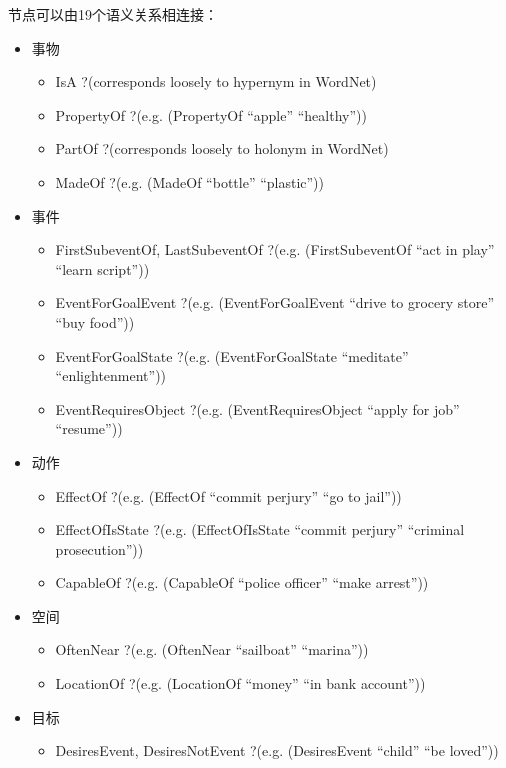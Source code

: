 节点可以由19个语义关系相连接：
\begin{itemize}

\item 事物 
\begin{itemize}
\item IsA ?(corresponds loosely to hypernym in WordNet)
\item PropertyOf ?(e.g. (PropertyOf ``apple'' ``healthy''))
\item PartOf ?(corresponds loosely to holonym in WordNet)
\item MadeOf ?(e.g. (MadeOf ``bottle'' ``plastic''))
\end{itemize}

\item 事件 
\begin{itemize}
\item FirstSubeventOf, LastSubeventOf ?(e.g. (FirstSubeventOf ``act in play'' ``learn script''))
\item EventForGoalEvent ?(e.g. (EventForGoalEvent ``drive to grocery store'' ``buy food''))
\item EventForGoalState ?(e.g. (EventForGoalState ``meditate'' ``enlightenment''))
\item EventRequiresObject ?(e.g. (EventRequiresObject ``apply for job'' ``resume''))
\end{itemize}

\item 动作 
\begin{itemize}
\item EffectOf ?(e.g. (EffectOf ``commit perjury'' ``go to jail''))
\item EffectOfIsState ?(e.g. (EffectOfIsState ``commit perjury'' ``criminal prosecution''))
\item CapableOf ?(e.g. (CapableOf ``police officer'' ``make arrest''))
\end{itemize}

\item 空间 
\begin{itemize}
\item OftenNear ?(e.g. (OftenNear ``sailboat'' ``marina''))
\item LocationOf ?(e.g. (LocationOf ``money'' ``in bank account''))
\end{itemize}

\item 目标 
\begin{itemize}
\item DesiresEvent, DesiresNotEvent ?(e.g. (DesiresEvent ``child'' ``be loved''))
\end{itemize}


\end{itemize}

